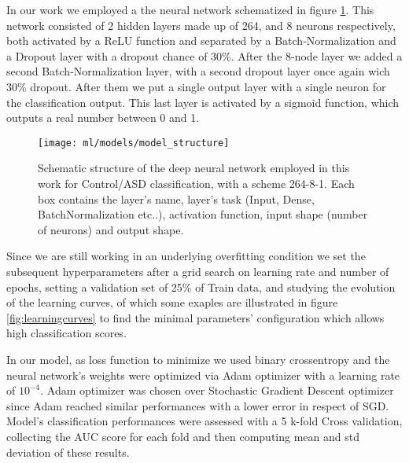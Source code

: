 \documentclass[11pt]{report}
\begin{document}
In our work we employed a the neural network schematized in figure \ref{fig:model_structure}.
This network consisted of 2 hidden layers made up of 264, and 8 neurons respectively, both activated by a ReLU function and separated by a Batch-Normalization and a Dropout layer with a dropout chance of 30\%.
After the 8-node layer we added a second Batch-Normalization layer, with a second dropout layer once again wich 30\% dropout.
After them we put a single output layer with a single neuron for the classification output.
This last layer is activated by a sigmoid function, which outputs a real number between 0 and 1.



\begin{figure}[h!]
\centering
\texttt{[image: ml/models/model\_structure]}
\caption{Schematic structure of the deep neural network employed in this work for Control/ASD classification, with a scheme 264-8-1.
Each box contains the layer's name, layer's task (Input, Dense, BatchNormalization etc..), activation function, input shape (number of neurons) and output shape.}
\label{fig:model_structure}
\end{figure}


Since we are still working in an underlying overfitting condition we set the subsequent hyperparameters after a grid search on learning rate and number of epochs, setting a validation set of 25\% of Train data, and studying the evolution of the learning curves, of which some exaples are illustrated in figure \ref{fig:learningcurves} to find the minimal parameters' configuration which allows high classification scores.

In our model, as loss function to minimize we used binary crossentropy and the neural network's weights were optimized via Adam optimizer with a learning rate of $10^{-4}$.
Adam optimizer was chosen over Stochastic Gradient Descent optimizer since Adam reached similar performances with a lower error in respect of SGD.
Model's classification performances were assessed with a 5 k-fold Cross validation, collecting the AUC score for each fold and then computing mean and std deviation of these results.

\end{document}
